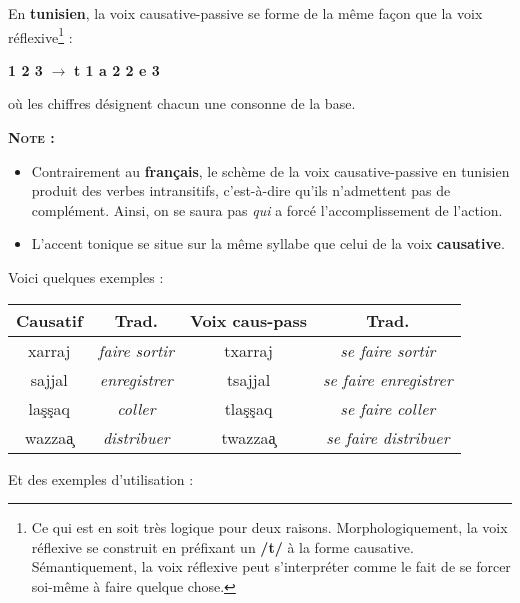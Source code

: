 En \textbf{tunisien}, la voix causative-passive se forme de la même façon que la voix réflexive\footnote{Ce qui est en soit très logique pour deux raisons. Morphologiquement, la voix réflexive se construit en préfixant un \textbf{/t/} à la forme causative. Sémantiquement, la voix réflexive peut s'interpréter comme le fait de se forcer soi-même à faire quelque chose.} : 

\begin{center}
    \Large{\textbf{1 2 3} $\rightarrow$ \textbf{t 1 a 2 2 e 3}}
\end{center}

où les chiffres désignent chacun une consonne de la base.

\textbf{\textsc{Note :}} 
\begin{itemize}
    \item Contrairement au \textbf{français}, le schème de la voix causative-passive en tunisien produit des verbes intransitifs, c'est-à-dire qu'ils n'admettent pas de complément. Ainsi, on se saura pas \textit{qui} a forcé l'accomplissement de l'action.
    \item L'accent tonique se situe sur la même syllabe que celui de la voix \textbf{causative}.
\end{itemize}


Voici quelques exemples : 

\begin{center}
\begin{tabular}{||c | c | c | c ||}
 \hline
  \textbf{Causatif} & \textbf{Trad.} & \textbf{Voix caus-pass} & \textbf{Trad.} \\
 \hline\hline
  xarraj & \textit{faire sortir} & txarraj & \textit{se faire sortir}\\
  \hline
  sajjal & \textit{enregistrer} & tsajjal & \textit{se faire enregistrer}\\
  \hline
  la\c{s}\c{s}aq & \textit{coller} & tla\c{s}\c{s}aq & \textit{se faire coller}\\
  \hline
  wazza\c{a} & \textit{distribuer} & twazza\c{a} & \textit{se faire distribuer}\\
  \hline
\end{tabular}    
\end{center}

Et des exemples d'utilisation : 

